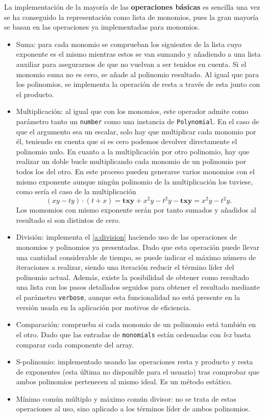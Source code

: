 La implementación de la mayoría de las \textbf{operaciones básicas} es sencilla una vez se ha conseguido la representación como lista de monomios, pues la gran mayoría se basan en las operaciones ya implementadas para monomios.
\begin{itemize}
    \item Suma: para cada monomio se comprueban los siguientes de la lista cuyo exponente es el mismo mientras estos se van sumando y añadiendo a una lista auxiliar para asegurarnos de que no vuelvan a ser tenidos en cuenta. Si el monomio suma no es cero, se añade al polinomio resultado. Al igual que para los polinomios, se implementa la operación de resta a través de esta junto con el producto.
    \item Multiplicación: al igual que con los monomios, este operador admite como parámetro tanto un \texttt{number} como una instancia de \texttt{Polynomial}. En el caso de que el argumento sea un escalar, solo hay que multiplicar cada monomio por él, teniendo en cuenta que si es cero podemos devolver directamente el polinomio nulo. En cuanto a la multiplicación por otro polinomio, hay que realizar un doble bucle multiplicando cada monomio de un polinomio por todos los del otro. En este proceso pueden generarse varios monomios con el mismo exponente aunque ningún polinomio de la multiplicación los tuviese, como sería el caso de la multiplicación
    $$(xy - ty)\cdot(t+x) = \boldsymbol{txy} + x^2y -t^2y - \boldsymbol{txy} = x^2y -t^2y.$$
    Los momomios con mismo exponente serán por tanto sumados y añadidos al resultado si son distintos de cero.
    \item División: implementa el \autoref{a:division} haciendo uso de las operaciones de monomios y polinomios ya presentadas. Dado que esta operación puede llevar una cantidad considerable de tiempo, se puede indicar el máximo número de iteraciones a realizar, siendo una iteración reducir el término líder del polinomio actual. Además, existe la posibilidad de obtener como resultado una lista con los pasos detallados seguidos para obtener el resultado mediante el parámetro \texttt{verbose}, aunque esta funcionalidad no está presente en la versión usada en la aplicación por motivos de eficiencia.
    \item Comparación: comprueba si cada monomio de un polinomio está también en el otro. Dado que las entradas de \texttt{monomials} están ordenadas con \textit{lex} basta comparar cada componente del array.
    \item S-polinomio: implementado usando las operaciones resta y producto y resta de exponentes (esta última no disponible para el usuario) tras comprobar que ambos polinomios pertenecen al mismo ideal. Es un método estático.
    \item Mínimo común múltiplo y máximo común divisor: no se trata de estas operaciones al uso, sino aplicado a los términos líder de ambos polinomios.
\end{itemize}

